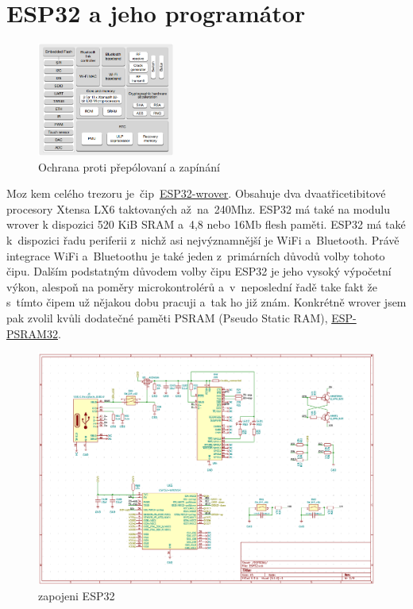 \section*{ESP32 a jeho programátor}

\begin{figure}
    \centering
    \includegraphics[width=0.4\textwidth]{kapitoly/obrazky/E4/ESP32/BlockDiagram.png}
    \caption{\label{fig:frog1}Ochrana proti přepólovaní a zapínání}
\end{figure}

Moz kem celého trezoru je~čip~\href{https://www.espressif.com/sites/default/files/documentation/esp32-wrover-b_datasheet_en.pdf}{ESP32-wrover}. 
Obsahuje dva dvaatřicetibitové procesory Xtensa LX6 taktovaných až~na~240Mhz. ESP32 má také na modulu wrover k dispozici 520 KiB SRAM 
a~4,8 nebo 16Mb flesh paměti. ESP32 má také k~dispozici řadu periferii z~nichž asi nejvýznamnější je WiFi a~Bluetooth. Právě integrace 
WiFi a~Bluetoothu je také jeden z~primárních důvodů volby tohoto čipu. Dalším podstatným důvodem volby čipu ESP32 je jeho vysoký výpočetní výkon, 
alespoň na poměry microkontrolérů a~v~neposlední řadě take fakt že s~tímto čipem už nějakou dobu pracuji a~tak ho již znám. Konkrétně wrover 
jsem pak zvolil kvůli dodatečné paměti PSRAM (Pseudo Static RAM), \href{http://gamma.spb.ru/images/pdf/esp-psram32_datasheet_en.pdf}{ESP-PSRAM32}.

\begin{figure}[htbp]
    \centering
    \includegraphics[width=\textwidth]{kapitoly/obrazky/E4/ESP32/sch.png}
    \caption{zapojeni ESP32}
    \label{fig:E4-step-up}
\end{figure}

